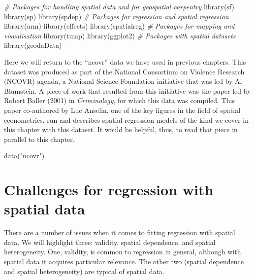 \documentclass[
  krantz2]{krantz}
\makeatletter
\newenvironment{Shaded}{\begin{snugshade}}{\end{snugshade}}
\newcommand{\CommentTok}[1]{\textcolor[rgb]{0.37,0.37,0.37}{\textit{#1}}}
\newcommand{\FunctionTok}[1]{\textcolor[rgb]{0,0,0}{#1}}
\newcommand{\NormalTok}[1]{#1}
\newcommand{\StringTok}[1]{\textcolor[rgb]{0.5,0.5,0.5}{#1}}
\newenvironment{kframe}{%
\medskip{}
\setlength{\fboxsep}{.8em}
 \def\at@end@of@kframe{}%
 \ifinner\ifhmode%
  \def\at@end@of@kframe{\end{minipage}}%
  \begin{minipage}{\columnwidth}%
 \fi\fi%
 \def\FrameCommand##1{\hskip\@totalleftmargin \hskip-\fboxsep
 \colorbox{shadecolor}{##1}\hskip-\fboxsep
     \hskip-\linewidth \hskip-\@totalleftmargin \hskip\columnwidth}%
 \MakeFramed {\advance\hsize-\width
   \@totalleftmargin\z@ \linewidth\hsize
   \@setminipage}}%
 {\par\unskip\endMakeFramed%
 \at@end@of@kframe}
\renewenvironment{Shaded}{\begin{kframe}}{\end{kframe}}
\makeatother
\begin{document}
\begin{Shaded}
\begin{Highlighting}[]
\CommentTok{\# Packages for handling spatial data and for geospatial carpentry}
\FunctionTok{library}\NormalTok{(sf)}
\FunctionTok{library}\NormalTok{(sp)}
\FunctionTok{library}\NormalTok{(spdep)}
\CommentTok{\# Packages for regression and spatial regression}
\FunctionTok{library}\NormalTok{(arm)}
\FunctionTok{library}\NormalTok{(effects)}
\FunctionTok{library}\NormalTok{(spatialreg)}
\CommentTok{\# Packages for mapping and visualisation}
\FunctionTok{library}\NormalTok{(tmap)}
\FunctionTok{library}\NormalTok{(ggplot2)}
\CommentTok{\# Packages with spatial datasets}
\FunctionTok{library}\NormalTok{(geodaData)}
\end{Highlighting}
\end{Shaded}

Here we will return to the ``ncovr'' data we have used in previous chapters. This dataset was produced as part of the National Consortium on Violence Research (NCOVR) agenda, a National Science Foundation initiative that was led by Al Blumstein. A piece of work that resulted from this initiative was the paper led by Robert Baller (2001) in \emph{Criminology}, for which this data was compiled. This paper co-authored by Luc Anselin, one of the key figures in the field of spatial econometrics, run and describes spatial regression models of the kind we cover in this chapter with this dataset. It would be helpful, thus, to read that piece in parallel to this chapter.

\begin{Shaded}
\begin{Highlighting}[]
\FunctionTok{data}\NormalTok{(}\StringTok{"ncovr"}\NormalTok{)}
\end{Highlighting}
\end{Shaded}

\hypertarget{challenges-for-regression-with-spatial-data}{%
\section{Challenges for regression with spatial data}\label{challenges-for-regression-with-spatial-data}}

There are a number of issues when it comes to fitting regression with spatial data. We will highlight three: validity, spatial dependence, and spatial heterogeneity. One, validity, is common to regression in general, although with spatial data it acquires particular relevance. The other two (spatial dependence and spatial heterogeneity) are typical of spatial data.
\end{document}
